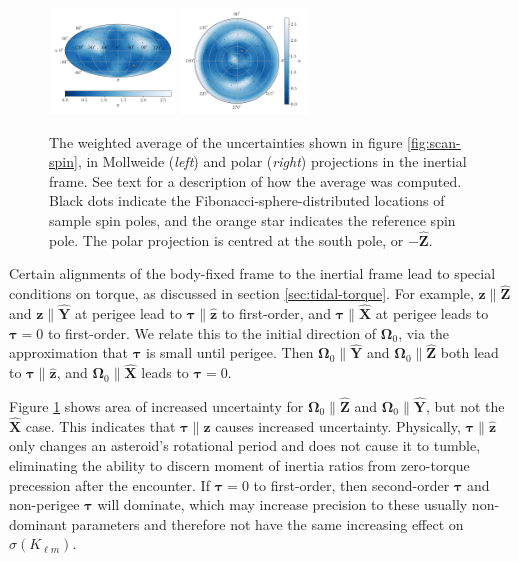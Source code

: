 \documentclass[fleqn,usenatbib]{mnras}
\newcommand{\unit}[1]{\bm{\hat{#1}}}
\begin{document}
\begin{figure}
  \centering
  \includegraphics[width=0.3\textwidth]{figs/spin-pole-avg-mollweide.png}
  \includegraphics[width=0.3\textwidth]{figs/spin-pole-avg-polar.png}
  \caption{The weighted average of the uncertainties shown in figure \ref{fig:scan-spin}, in Mollweide (\textit{left}) and polar (\textit{right}) projections in the inertial frame. See text for a description of how the average was computed. Black dots indicate the Fibonacci-sphere-distributed locations of sample spin poles, and the orange star indicates the reference spin pole. The polar projection is centred at the south pole, or $-\unit Z$.}
  \label{fig:scan-spin-avg}
\end{figure}

Certain alignments of the body-fixed frame to the inertial frame lead to special conditions on torque, as discussed in section \ref{sec:tidal-torque}. For example, $\bm z \parallel \unit Z$ and $\bm z \parallel \unit Y$ at perigee lead to $\bm \tau \parallel \unit z$ to first-order, and $\bm \tau \parallel \unit X$ at perigee leads to $\bm \tau = 0$ to first-order. We relate this to the initial direction of $\bm \Omega_0$, via the approximation that $\bm \tau$ is small until perigee. Then $\bm \Omega_0 \parallel \unit Y$ and $\bm \Omega_0 \parallel \unit Z$ both lead to $\bm \tau \parallel \unit z$, and $\bm \Omega_0 \parallel \unit X$ leads to $\bm \tau = 0$.

Figure \ref{fig:scan-spin-avg} shows area of increased uncertainty for $\bm \Omega_0 \parallel \unit Z$ and $\bm \Omega_0 \parallel \unit Y$, but not the $\unit X$ case. This indicates that $\bm \tau \parallel \unit z$ causes increased uncertainty. Physically, $\bm \tau \parallel \unit z$ only changes an asteroid's rotational period and does not cause it to tumble, eliminating the ability to discern moment of inertia ratios from zero-torque precession after the encounter. If $\bm \tau = 0$ to first-order, then second-order $\bm \tau$ and non-perigee $\bm \tau$ will dominate, which may increase precision to these usually non-dominant parameters and therefore not have the same increasing effect on $\sigma(K_{\ell m})$.
\end{document}
